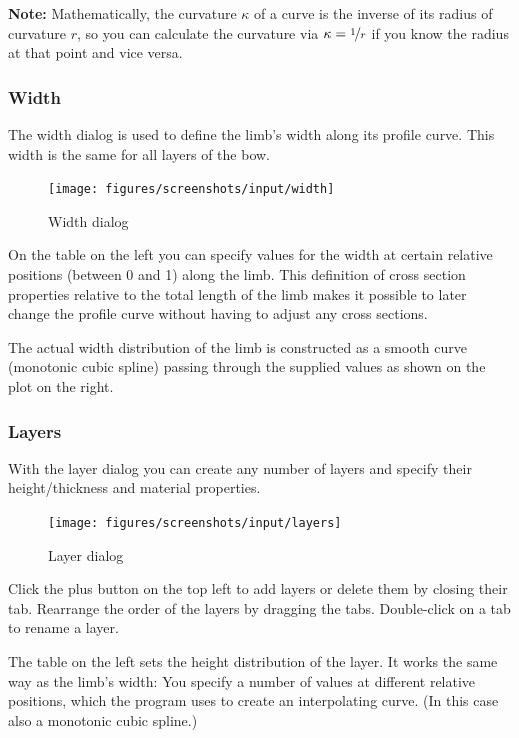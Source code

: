 \documentclass[12pt]{article}
\begin{document}
\bigskip

\textbf{Note:} Mathematically, the curvature $\kappa$ of a curve is the inverse of its radius of curvature $r$, so you can calculate the curvature via $\kappa = \nicefrac{1}{r}$ if you know the radius at that point and vice versa.

\newpage
\subsubsection{Width}

The width dialog is used to define the limb's width along its profile curve. This width is the same for all layers of the bow.

\bigskip

\begin{figure}[H]
\centering
\texttt{[image: figures/screenshots/input/width]}
\caption{Width dialog}
\label{fig:width}
\end{figure}

On the table on the left you can specify values for the width at certain relative positions (between 0 and 1) along the limb. This definition of cross section properties relative to the total length of the limb makes it possible to later change the profile curve without having to adjust any cross sections.

The actual width distribution of the limb is constructed as a smooth curve (monotonic cubic spline) passing through the supplied values as shown on the plot on the right.

\newpage
\subsubsection{Layers}

With the layer dialog you can create any number of layers and specify their height/thickness and material properties.
\bigskip

\begin{figure}[H]
\centering
\texttt{[image: figures/screenshots/input/layers]}
\caption{Layer dialog}
\label{fig:width}
\end{figure}

Click the plus button on the top left to add layers or delete them by closing their tab.
Rearrange the order of the layers by dragging the tabs.
Double-click on a tab to rename a layer.

The table on the left sets the height distribution of the layer. It works the same way as the limb's width: You specify a number of values at different relative positions, which the program uses to create an interpolating curve. (In this case also a monotonic cubic spline.)
\end{document}
